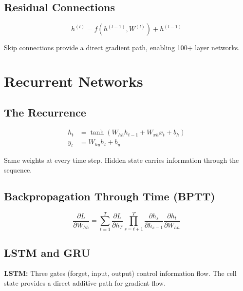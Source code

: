 \documentclass[11pt,a4paper]{book}
\begin{document}
\section{Residual Connections}

\begin{equation}
    h^{(l)} = f(h^{(l-1)}, W^{(l)}) + h^{(l-1)}
\end{equation}

Skip connections provide a direct gradient path, enabling 100+ layer networks.

\clearpage

\chapter{Recurrent Networks}\label{ch:rnn}

\section{The Recurrence}

\begin{align}
    h_t &= \tanh(W_{hh} h_{t-1} + W_{xh} x_t + b_h) \\
    y_t &= W_{hy} h_t + b_y
\end{align}

Same weights at every time step. Hidden state carries information through the sequence.

\section{Backpropagation Through Time (BPTT)}

\begin{equation}
    \frac{\partial L}{\partial W_{hh}} = \sum_{t=1}^{T} \frac{\partial L}{\partial h_T} \prod_{s=t+1}^{T} \frac{\partial h_s}{\partial h_{s-1}} \frac{\partial h_t}{\partial W_{hh}}
\end{equation}

\section{LSTM and GRU}

\textbf{LSTM:} Three gates (forget, input, output) control information flow. The cell state provides a direct additive path for gradient flow.
\end{document}
